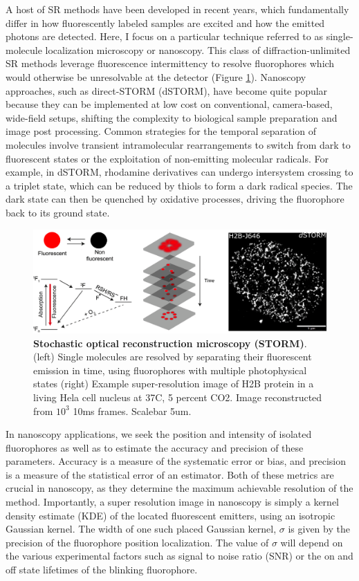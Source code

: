 A host of SR methods have been developed in recent years, which fundamentally differ in how fluorescently labeled samples are excited and how the emitted photons are detected. Here, I focus on a particular technique referred to as single-molecule localization microscopy or nanoscopy. This class of diffraction-unlimited SR methods leverage fluorescence intermittency to resolve fluorophores which would otherwise be unresolvable at the detector (Figure \ref{fig:fig1}). Nanoscopy approaches, such as direct-STORM (dSTORM), have become quite popular because they can be implemented at low cost on conventional, camera-based, wide-field setups, shifting the complexity to biological sample preparation and image post processing. Common strategies for the temporal separation of molecules involve transient intramolecular rearrangements to switch from dark to fluorescent states or the exploitation of non-emitting molecular radicals. For example, in dSTORM, rhodamine derivatives can undergo intersystem crossing to a triplet state, which can be reduced by thiols to form a dark radical species. The dark state can then be quenched by oxidative processes, driving the fluorophore back to its ground state. 

\begin{figure}[t]
\centering
\includegraphics[width=15cm]{media/Intro.png}
\caption{\textbf{Stochastic optical reconstruction microscopy (STORM)}. (left) Single molecules are resolved by separating their fluorescent emission in time, using fluorophores with multiple photophysical states (right) Example super-resolution image of H2B protein in a living Hela cell nucleus at 37C, 5 percent CO2. Image reconstructed from $10^{3}$ 10ms frames. Scalebar 5um.}
\label{fig:fig1}
\end{figure}

In nanoscopy applications, we seek the position and intensity of isolated fluorophores as well as to estimate the accuracy and precision of these parameters. Accuracy is a measure of the systematic error or bias, and precision is a measure of the statistical error of an estimator. Both of these metrics are crucial in nanoscopy, as they determine the maximum achievable resolution of the method. Importantly, a super resolution image in nanoscopy is simply a kernel density estimate (KDE) of the located fluorescent emitters, using an isotropic Gaussian kernel. The width of one such placed Gaussian kernel, $\sigma$ is given by the precision of the fluorophore position localization. The value of $\sigma$ will depend on the various experimental factors such as signal to noise ratio (SNR) or the on and off state lifetimes of the blinking fluorophore. 

